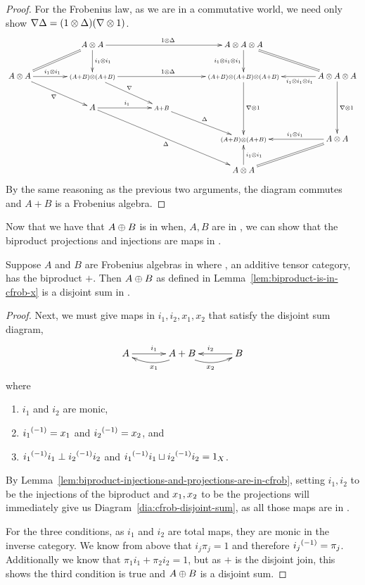\begin{proof}
  For the Frobenius law, as we are in a commutative world, we need only show
  $\nabla \Delta = (1\otimes\Delta)(\nabla\otimes1)$.
  \[
  \xymatrix@C+17pt{
      &A\*A \ar@{=}[ld] \ar[rr]^{1\*\Delta} \ar[d]^{i_1\*i_1} && A\*A\*A  \ar[d]_{i_1\*i_1\*i_1} \ar@{=}[dr] \\
      A\*A \ar[r]^(.45){i_1\*i_1}  \ar[dr]_{\nabla}
         &\scriptstyle{(A+B)\*(A+B)} \ar[rr]^{1\*\Delta} \ar[dr]^{\nabla}
         &&\scriptstyle{(A+B)\*(A+B)\*(A+B)}  \ar[dd]^{\nabla\*1} & A\*A\*A  \ar[l]^(.4){i_1\*i_1\*i_1}  \ar[dd]^{\nabla\*1}\\
     & A \ar[r]^{i_1} \ar[ddrr]_{\Delta} & \scriptstyle{A+B} \ar[dr]^{\Delta} \\
     & & & \scriptstyle{(A+B)\*(A+B)} & A\*A  \ar[l]_(.45){i_1\*i_1} \ar@{=}[dl]\\
     & & & A\*A \ar[u]_{i_1\*i_1}
    }
  \]
  By the same reasoning as the previous two arguments, the diagram commutes and $A+B$ is a Frobenius
  algebra.
\end{proof}

Now that we have that $A\oplus B$ is in \CFrob when, $A,B$ are in \CFrob, we can show that the
biproduct projections and injections are maps in \CFrob.


\begin{proposition}\label{prop:cfrobx_has_disjoint_sums}
  Suppose $A$ and $B$ are Frobenius algebras in \CFrob where \X, an additive tensor category, has
  the biproduct $+$.
  Then $A\oplus B$ as defined in Lemma~\ref{lem:biproduct-is-in-cfrob-x} is a disjoint sum in \CFrob.
\end{proposition}
\begin{proof}
  Next, we must give maps in \CFrob $i_1,i_2,x_1,x_2$ that satisfy the disjoint sum diagram,
  \begin{equation}
    \xymatrix@C+10pt{
      A\ar[r]^{i_1} &A+B\ar@/^9pt/[l]^{x_1} \ar@/_9pt/[r]_{x_2} & B \ar[l]_{i_2}
    }\label{dia:cfrob-disjoint-sum}
  \end{equation}
  where
  \begin{enumerate}[{(}i{)}]
    \item $i_1$ and $i_2$ are monic,
    \item ${i_1}^{(-1)} = x_1$ and ${i_2}^{(-1)} = x_2$, and
    \item ${i_1}^{(-1)}i_1 \perp {i_2}^{(-1)}i_2$ and ${i_1}^{(-1)}i_1 \sqcup {i_2}^{(-1)}i_2 = 1_X$.
  \end{enumerate}

  By Lemma~\ref{lem:biproduct-injections-and-projections-are-in-cfrob}, setting $i_1,i_2$ to be the
  injections of the biproduct and $x_1,x_2$ to be the projections will immediately give us
  Diagram~\ref{dia:cfrob-disjoint-sum}, as all those maps are in \CFrob.

  For the three conditions, as $i_1$ and $i_2$ are total maps, they are monic in the inverse
  category. We know from above that $i_j\pi_j = 1$ and therefore ${i_j}^{(-1)} = \pi_j$. Additionally
  we know that $\pi_1i_1 + \pi_2i_2 = 1$, but as $+$ is the disjoint join, this shows the third
  condition is true and $A\oplus B$ is a disjoint sum.
\end{proof}


